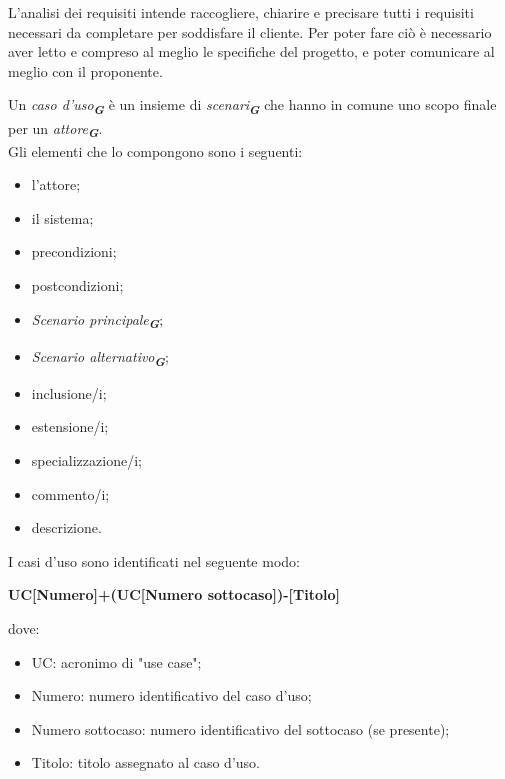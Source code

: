 \begin{enumerate}
L’analisi dei requisiti intende raccogliere, chiarire e precisare tutti i requisiti necessari da completare per soddisfare il cliente. Per poter fare ciò è necessario aver letto e compreso al meglio le specifiche del progetto, e poter comunicare al meglio con il proponente.

Un \emph{caso d'uso}\textsubscript{\textit{\textbf{G}}} è un insieme di \emph{scenari}\textsubscript{\textit{\textbf{G}}} che hanno in comune uno scopo finale per un \emph{attore}\textsubscript{\textit{\textbf{G}}}.\\
Gli elementi che lo compongono sono i seguenti:
\begin{itemize}
    \item l'attore;
    \item il sistema;
    \item precondizioni;
    \item postcondizioni;
    \item \emph{Scenario principale}\textsubscript{\textit{\textbf{G}}};
    \item \emph{Scenario alternativo}\textsubscript{\textit{\textbf{G}}};
    \item inclusione/i;
    \item estensione/i;
    \item specializzazione/i;
    \item commento/i;
    \item descrizione.  
\end{itemize}
I casi d’uso sono identificati nel seguente modo:\\
\begin{center}
    \textbf{UC[Numero]+(UC[Numero sottocaso])-[Titolo]}
\end{center}
dove:
\begin{itemize}
    \item UC: acronimo di "use case";
    \item Numero: numero identificativo del caso d’uso;
    \item Numero sottocaso: numero identificativo del sottocaso (se presente);
    \item Titolo: titolo assegnato al caso d’uso.
\end{itemize}


\end{enumerate}
